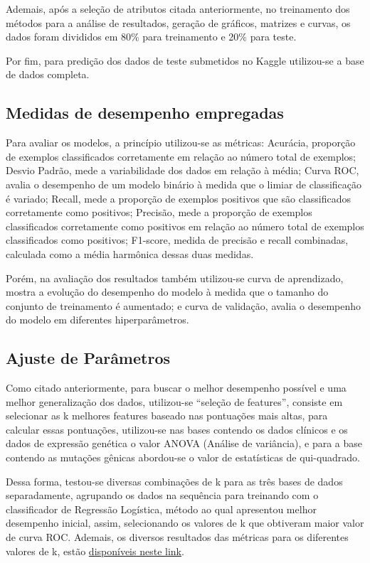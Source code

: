 \documentclass[10pt, conference, compsocconf]{IEEEtran}
\begin{document}
Ademais, após a seleção de atributos citada anteriormente, no treinamento dos métodos para a análise de resultados, geração de gráficos, matrizes e curvas, os dados foram divididos em 80\% para treinamento e 20\% para teste. 

Por fim, para predição dos dados de teste submetidos no Kaggle utilizou-se a base de dados completa.

\subsection{Medidas de desempenho empregadas}
Para avaliar os modelos, a princípio utilizou-se as métricas: Acurácia, proporção de exemplos classificados corretamente em relação ao número total de exemplos; Desvio Padrão, mede a variabilidade dos dados em relação à média; Curva ROC, avalia o desempenho de um modelo binário à medida que o limiar de classificação é variado;  Recall, mede a proporção de exemplos positivos que são classificados corretamente como positivos; Precisão, mede a proporção de exemplos classificados corretamente como positivos em relação ao número total de exemplos classificados como positivos; F1-score, medida de precisão e recall combinadas, calculada como a média harmônica dessas duas medidas. 

Porém, na avaliação dos resultados também utilizou-se curva de aprendizado, mostra a evolução do desempenho do modelo à medida que o tamanho do conjunto de treinamento é aumentado; e curva de validação, avalia o desempenho do modelo em diferentes hiperparâmetros.

\subsection{Ajuste de Parâmetros}
Como citado anteriormente, para buscar o melhor desempenho possível e uma melhor generalização dos dados, utilizou-se “seleção de features”, consiste em selecionar as k melhores features baseado nas pontuações mais altas, para calcular essas pontuações, utilizou-se nas bases contendo os dados clínicos e os dados de expressão genética o valor ANOVA (Análise de variância), e para a base contendo as mutações gênicas abordou-se o valor de estatísticas de qui-quadrado. 

Dessa forma, testou-se diversas combinações de k para as três bases de dados separadamente, agrupando os dados na sequência para treinando com o classificador de Regressão Logística, método ao qual apresentou melhor desempenho inicial, assim, selecionando os valores de k que obtiveram maior valor de curva ROC. Ademais, os diversos resultados das métricas para os diferentes valores de k, estão \href{https://drive.google.com/drive/folders/1tm04wXXDOEbq36WOWo67gdHbZM_52TB1?usp=sharing}{disponíveis neste link}.
\end{document}

